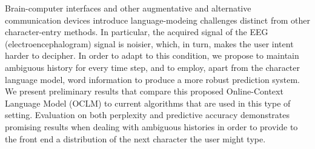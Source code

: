 Brain-computer interfaces and other augmentative and alternative communication devices introduce language-modeing challenges distinct from other character-entry methods.  In particular, the acquired signal of the EEG (electroencephalogram) signal is noisier, which, in turn, makes the user intent harder to decipher. In order to adapt to this condition, we propose to maintain ambiguous history for every time step, and to employ, apart from the character language model, word information to produce a more robust prediction system. We present preliminary results that compare this proposed Online-Context Language Model (OCLM) to current algorithms that are used in this type of setting. Evaluation on both perplexity and predictive accuracy demonstrates promising results when dealing with ambiguous histories in order to provide to the front end a distribution of the next character the user might type.
